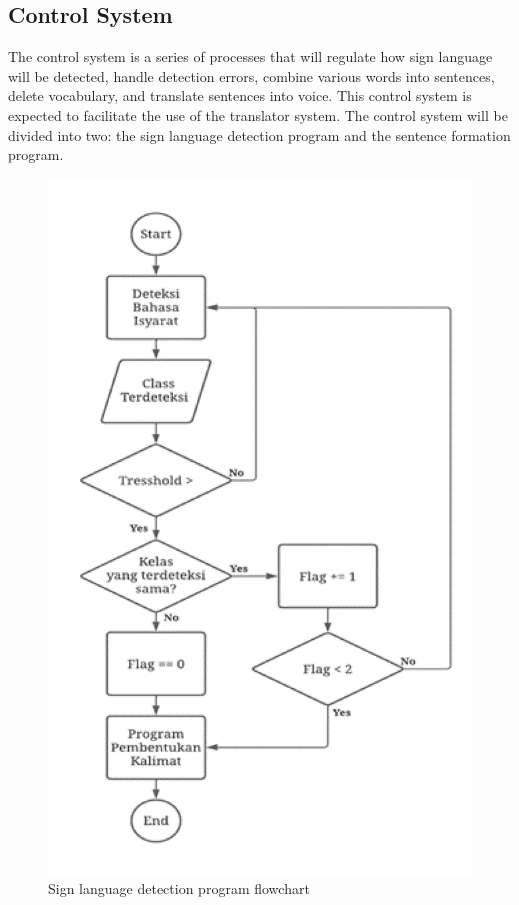 \subsection{Control System}
\label{subsec:controlsystem}

The control system is a series of processes that will regulate how sign language will be detected, handle detection errors, combine various words into sentences, delete vocabulary, and translate sentences into voice. This control system is expected to facilitate the use of the translator system. The control system will be divided into two: the sign language detection program and the sentence formation program.

\newpage

\begin{figure}[H]
  \centering
  \includegraphics[scale=0.36]{gambar/bab3-flowchart-deteksi.png}
  \caption{Sign language detection program flowchart}
  \label{fig:flowchartdeteksi}
\end{figure}

